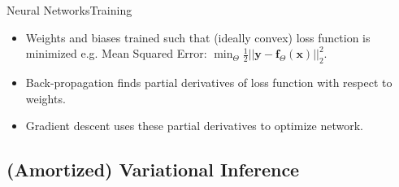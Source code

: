 \documentclass{beamer}
\begin{document}
\begin{frame}{Neural Networks}{Training}
\begin{itemize}
\item Weights and biases trained such that (ideally convex) loss function is minimized e.g. Mean Squared Error: $\min_\Theta \frac{1}{2}||\bm{y}-\bm{f}_\Theta(\bm{x})||^2_2$.
\item Back-propagation finds partial derivatives of loss function with respect to weights.
\item Gradient descent uses these partial derivatives to optimize network.
\end{itemize}
\end{frame}
\subsection{(Amortized) Variational Inference}
\end{document}
